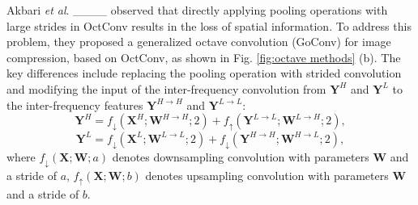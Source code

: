 Akbari \textit{et al}. ____ observed that directly applying pooling operations with large strides in OctConv results in the loss of spatial information. To address this problem, they proposed a generalized octave convolution (GoConv) for image compression, based on OctConv, as shown in Fig. \ref{fig:octave methods} (b). The key differences include replacing the pooling operation with strided convolution and modifying the input of the inter-frequency convolution from \(\bm{Y}^H\) and \(\bm{Y}^L\) to the inter-frequency features \(\bm{Y}^{H \rightarrow H}\) and \(\bm{Y}^ {L \rightarrow L}\):
\begin{equation}
\bm{Y}^H = f_{\downarrow}\left(\bm{X}^H; \bm{W}^{H \rightarrow H}; 2\right) + f_{\uparrow}\left(\bm{Y}^{L \rightarrow L}; \bm{W}^{L \rightarrow H}; 2\right),
\end{equation}
\begin{equation}
\bm{Y}^L = f_{\downarrow}\left(\bm{X}^L; \bm{W}^{L \rightarrow L}; 2\right) + f_{\downarrow}\left(\bm{Y}^{H \rightarrow H}; \bm{W}^{H \rightarrow L}; 2\right),
\end{equation}
where $f_{\downarrow}(\bm{X};\bm{W};a)$ denotes downsampling convolution with parameters $\bm{W}$ and a stride of \( a \), $f_{\uparrow}(\bm{X};\bm{W};b)$ denotes upsampling convolution with parameters $\bm{W}$ and a stride of \( b \).

